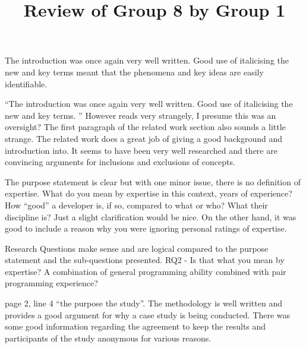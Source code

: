 \documentclass[times, 10pt,twocolumn]{IEEEtran}
\begin{document}
\title{Review of Group 8 by Group 1}

\author{


}


\maketitle
\thispagestyle{empty}







The introduction was once again very well written. Good use of italicising the new and key terms meant that the phenomena and key ideas are easily identifiable. 

``The introduction was once again very well written. Good use of italicising the new and key terms. '' However reads very strangely, I presume this was an oversight? The first paragraph of the related work section also sounds a little strange. The related work does a great job of giving a good background and introduction into. It seems to have been very well researched and there are convincing arguments for inclusions and exclusions of concepts.


The purpose statement is clear but with one minor issue, there is no definition of expertise. What do you mean by expertise in this context, years of experience? How ``good'' a developer is, if so, compared to what or who? What their discipline is? Just a slight clarification would be nice. On the other hand, it was good to include a reason why you were ignoring personal ratings of expertise.

Research Questions make sense and are logical compared to the purpose statement and the sub-questions presented.
RQ2 - Is that what you mean by expertise? A combination of general programming ability combined with pair programming experience?

page 2, line 4 ``the purpose the study''.
The methodology is well written and provides a good argument for why a case study is being conducted. There was some good information regarding the agreement to keep the results and participants of the study anonymous for various reasons.
\end{document}

